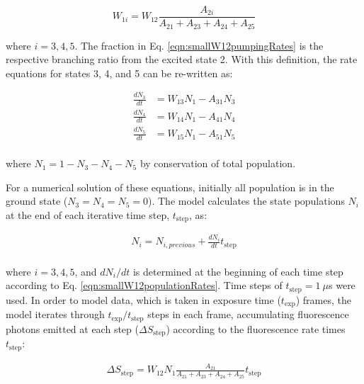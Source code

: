\begin{equation}
W_{1i} = W_{12}\frac{A_{2i}}{A_{21} + A_{23} + A_{24} + A_{25}}
\label{eqn:smallW12pumpingRates}
\end{equation}

\noindent
where $i = 3,4,5$.  The fraction in Eq. \ref{eqn:smallW12pumpingRates} is the respective branching ratio from the excited state 2.  With this definition, the rate equations for states 3, 4, and 5 can be re-written as:


\begin{equation}
\begin{aligned}
\frac{dN_3}{dt} &= W_{13}N_{1} - A_{31}N_{3} \\
\frac{dN_4}{dt} &= W_{14}N_{1} - A_{41}N_{4} \\
\frac{dN_5}{dt} &= W_{15}N_{1} - A_{51}N_{5} \\
\end{aligned}
\label{eqn:smallW12populationRates}
\end{equation}

\noindent
where $N_{1} = 1 - N_{3} - N_{4} - N_{5}$ by conservation of total population.

For a numerical solution of these equations, initially all population is in the ground state ($N_{3} = N_{4} = N_{5} = 0$).  The model calculates the state populations $N_{i}$ at the end of each iterative time step, $t_{\text{step}}$, as:

\begin{equation}
\begin{aligned}
N_{i} = N_{i, previous} + \frac{dN_i}{dt}t_{\text{step}} \\
\end{aligned}
\label{eqn:smallW12populations}
\end{equation}

\noindent
where $i = 3,4,5$, and $dN_i/dt$ is determined at the beginning of each time step according to Eq. \ref{eqn:smallW12populationRates}.  Time steps of $t_{\text{step}} = 1~\mu$s were used.  In order to model data, which is taken in exposure time ($t_{\text{exp}}$) frames, the model iterates through $t_{\text{exp}}/t_{\text{step}}$ steps in each frame, accumulating fluorescence photons emitted at each step ($\Delta S_{\text{step}}$) according to the fluorescence rate times $t_{\text{step}}$:

\begin{equation}
\begin{aligned}
\Delta S_{\text{step}} = W_{12}  N_{1} \frac{A_{21}}{A_{21} + A_{23} + A_{24} + A_{25}}t_{\text{step}} \\
\end{aligned}
\label{eqn:smallW12counts}
\end{equation}

